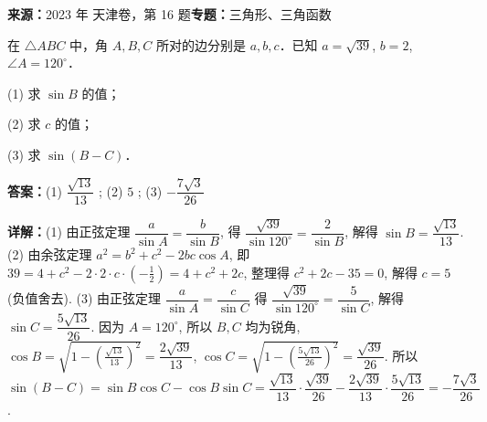\begin{question}[points=14]
\textbf{来源：}2023 年 天津卷，第 16 题\quad \textbf{专题：}三角形、三角函数\par
在 $\triangle ABC$ 中，角 $A, B, C$ 所对的边分别是 $a, b, c$．已知 $a = \sqrt{39}$, $b = 2$, $\angle A = 120^\circ$．

(1) 求 $\sin B$ 的值；

(2) 求 $c$ 的值；

(3) 求 $\sin(B - C)$．
\begin{solution}
\textbf{答案：}(1) $\dfrac{\sqrt{13}}{13}$ ; (2) $5$ ; (3) $-\dfrac{7\sqrt{3}}{26}$

\textbf{详解：}(1) 由正弦定理 $\dfrac{a}{\sin A} = \dfrac{b}{\sin B}$, 得 $\dfrac{\sqrt{39}}{\sin120^\circ} = \dfrac{2}{\sin B}$, 解得 $\sin B = \dfrac{\sqrt{13}}{13}$.
(2) 由余弦定理 $a^2 = b^2 + c^2 - 2bc\cos A$, 即 $39 = 4 + c^2 - 2\cdot 2 \cdot c \cdot \left(-\frac{1}{2}\right) = 4 + c^2 + 2c$, 整理得 $c^2 + 2c - 35 = 0$, 解得 $c = 5$ (负值舍去).
(3) 由正弦定理 $\dfrac{a}{\sin A} = \dfrac{c}{\sin C}$ 得 $\dfrac{\sqrt{39}}{\sin120^\circ} = \dfrac{5}{\sin C}$, 解得 $\sin C = \dfrac{5\sqrt{13}}{26}$. 因为 $A = 120^\circ$, 所以 $B, C$ 均为锐角, $\cos B = \sqrt{1-\left(\frac{\sqrt{13}}{13}\right)^2} = \dfrac{2\sqrt{39}}{13}$, $\cos C = \sqrt{1-\left(\frac{5\sqrt{13}}{26}\right)^2} = \dfrac{\sqrt{39}}{26}$. 所以 $\sin(B-C) = \sin B \cos C - \cos B \sin C = \dfrac{\sqrt{13}}{13} \cdot \dfrac{\sqrt{39}}{26} - \dfrac{2\sqrt{39}}{13} \cdot \dfrac{5\sqrt{13}}{26} = -\dfrac{7\sqrt{3}}{26}$.
\end{solution}
\end{question}

